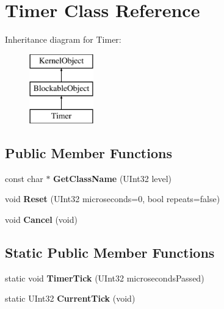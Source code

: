 \hypertarget{class_timer}{}\section{Timer Class Reference}
\label{class_timer}
Inheritance diagram for Timer\+:\begin{figure}[H]
\begin{center}
\leavevmode
\includegraphics[height=3.000000cm]{class_timer}
\end{center}
\end{figure}
\subsection*{Public Member Functions}
\begin{DoxyCompactItemize}
\item 
\mbox{\label{class_timer_a8160788e6bd8b73580f1c4d6fccf7761}} 
const char $\ast$ {\bfseries Get\+Class\+Name} (U\+Int32 level)
\item 
\mbox{\label{class_timer_a99fec173118caf8ec633ba0f898c865b}} 
void {\bfseries Reset} (U\+Int32 microseconds=0, bool repeats=false)
\item 
\mbox{\label{class_timer_a7d59255062bd8e2fef58d37a05565208}} 
void {\bfseries Cancel} (void)
\end{DoxyCompactItemize}
\subsection*{Static Public Member Functions}
\begin{DoxyCompactItemize}
\item 
\mbox{\label{class_timer_aeb33a8dc76b38e50f71ba44d77da4e69}} 
static void {\bfseries Timer\+Tick} (U\+Int32 microseconds\+Passed)
\item 
\mbox{\label{class_timer_a081e946b50daf84de2399f300b795097}} 
static U\+Int32 {\bfseries Current\+Tick} (void)
\end{DoxyCompactItemize}
